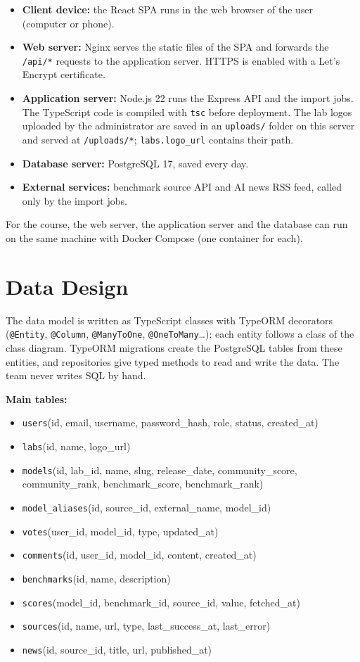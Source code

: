 \documentclass[11pt,a4paper]{article}
\begin{document}
\begin{itemize}
  \item \textbf{Client device:} the React SPA runs in the web browser of the user (computer or phone).
  \item \textbf{Web server:} Nginx serves the static files of the SPA and forwards the \texttt{/api/*} requests to the application server. HTTPS is enabled with a Let's Encrypt certificate.
  \item \textbf{Application server:} Node.js 22 runs the Express API and the import jobs. The TypeScript code is compiled with \texttt{tsc} before deployment. The lab logos uploaded by the administrator are saved in an \texttt{uploads/} folder on this server and served at \texttt{/uploads/*}; \texttt{labs.logo\_url} contains their path.
  \item \textbf{Database server:} PostgreSQL 17, saved every day.
  \item \textbf{External services:} benchmark source API and AI news RSS feed, called only by the import jobs.
\end{itemize}

For the course, the web server, the application server and the database can run on the same machine with Docker Compose (one container for each).

\section{Data Design}

The data model is written as TypeScript classes with TypeORM decorators (\texttt{@Entity}, \texttt{@Column}, \texttt{@ManyToOne}, \texttt{@OneToMany}\dots): each entity follows a class of the class diagram. TypeORM migrations create the PostgreSQL tables from these entities, and repositories give typed methods to read and write the data. The team never writes SQL by hand.


\textbf{Main tables:}
\begin{itemize}
  \item \texttt{users}(id, email, username, password\_hash, role, status, created\_at)
  \item \texttt{labs}(id, name, logo\_url)
  \item \texttt{models}(id, lab\_id, name, slug, release\_date, community\_score, community\_rank, benchmark\_score, benchmark\_rank)
  \item \texttt{model\_aliases}(id, source\_id, external\_name, model\_id)
  \item \texttt{votes}(user\_id, model\_id, type, updated\_at)
  \item \texttt{comments}(id, user\_id, model\_id, content, created\_at)
  \item \texttt{benchmarks}(id, name, description)
  \item \texttt{scores}(model\_id, benchmark\_id, source\_id, value, fetched\_at)
  \item \texttt{sources}(id, name, url, type, last\_success\_at, last\_error)
  \item \texttt{news}(id, source\_id, title, url, published\_at)
\end{itemize}
\end{document}
